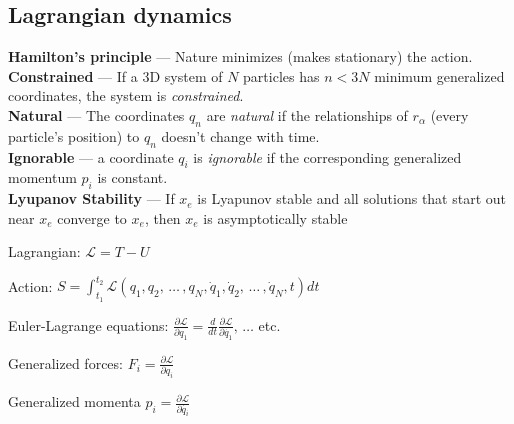 \documentclass[letterpaper,landscape,10pt]{article}
\newenvironment{mydescription}
{\begin{description}
	\setlength{\itemsep}{0pt}
	\setlength{\parskip}{0pt}
	\setlength{\parsep}{-1pt}}
{\end{description}}
\begin{document}
{\begin{multicols}{3}
	\subsection*{Lagrangian dynamics}
			  \textbf{Hamilton's principle} --- Nature minimizes (makes
			  stationary) the action.
			  \textbf{Constrained} --- If a 3D system of $N$ particles has $n <
			  3N$ minimum generalized coordinates, the system is
			  \emph{constrained}. \\
			  \textbf{Natural} --- The coordinates $q_n$ are \emph{natural} if
			  the relationships of $r_\alpha$ (every particle's position) to
			  $q_n$ doesn't change with time.\\
			  \textbf{Ignorable} --- a coordinate $q_i$ is \emph{ignorable} if
			  the corresponding generalized momentum $p_i$ is constant.\\
			  \textbf{Lyupanov Stability} --- If $x_e$ is Lyapunov stable
			  and all solutions that start out near $x_e$ converge to $x_e$,
			  then $x_e$ is asymptotically stable
		\begin{mydescription}
			\item[Lagrangian:]
			  $\mathscr{L}=T-U$
			\item[Action:]
			  $S = \int_{t_1}^{t_2}\mathscr{L}(q_1,q_2,\,\dots\, ,q_N,\dot{q}_1,\dot{q}_2,\,\dots \,,\dot{q}_N,t)dt$
			\item[Euler-Lagrange equations:]$\frac{\partial \mathscr{L}}{\partial q_1}=\frac{d}{dt}\frac{\partial \mathscr{L}}{\partial \dot{q_1}},\,\dots$ etc.
			\item[Generalized forces:]$F_i=\frac{\partial \mathscr{L}}{\partial
			  q_i}$
			\item[Generalized momenta]$p_i = \frac{\partial \mathscr{L}}{\partial \dot{q_i}}$
		\end{mydescription}
	

\end{multicols}}
\end{document}
